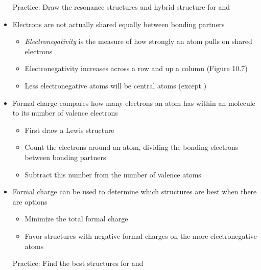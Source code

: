 \documentclass[12pt, openany, letterpaper]{memoir}
\begin{document}
\begin{itemize}
	Practice: Draw the resonance structures and hybrid structure for  and 
	\item Electrons are not actually shared equally between bonding partners
	\begin{itemize}
		\item \emph{Electronegativity} is the measure of how strongly an atom pulls on shared electrons
		\item Electronegativity increases across a row and up a column (Figure 10.7)
		\item Less electronegative atoms will be central atoms (except )
	\end{itemize}
	\item Formal charge compares how many electrons an atom has within an molecule to its number of valence electrons
	\begin{itemize}
		\item First draw a Lewis structure
		\item Count the electrons around an atom, dividing the bonding electrons between bonding partners
		\item Subtract this number from the number of valence atoms
	\end{itemize}
	\item Formal charge can be used to determine which structures are best when there are options
	\begin{itemize}
		\item Minimize the total formal charge
		\item Favor structures with negative formal charges on the more electronegative atoms
	\end{itemize}

	Practice: Find the best structures for  and 
\end{itemize}
\end{document}
